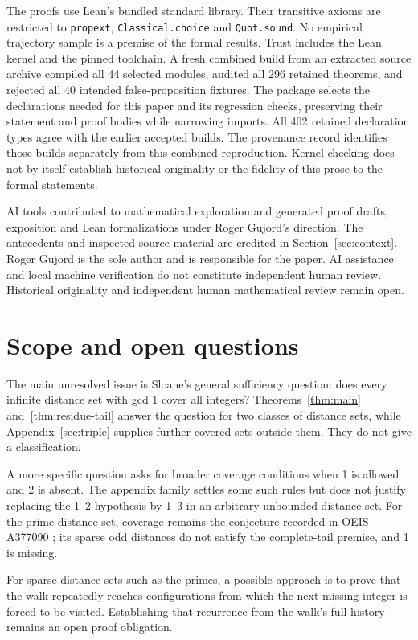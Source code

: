 \documentclass[11pt,a4paper]{article}
\newcommand{\code}[1]{\texttt{#1}}
\begin{document}
The proofs use Lean's bundled standard library. Their transitive axioms are
restricted to \code{propext}, \code{Classical.choice} and \code{Quot.sound}.
No empirical trajectory sample is a premise of the formal results.
Trust includes the Lean kernel and the pinned toolchain. A fresh combined
build from an extracted source archive compiled all 44 selected modules,
audited all 296 retained theorems, and rejected all 40 intended false-proposition
fixtures. The package selects the declarations needed for this paper and its
regression checks, preserving their statement and proof bodies while narrowing
imports. All 402 retained declaration types agree with the earlier accepted
builds. The provenance record identifies those builds separately from this
combined reproduction. Kernel checking does not by itself establish
historical originality or the fidelity of this prose to the formal statements.

AI tools contributed to mathematical exploration and generated proof drafts,
exposition and Lean formalizations under Roger Gujord's direction. The
antecedents and inspected source material are credited in
Section~\ref{sec:context}. Roger Gujord is the sole author and is responsible
for the paper. AI assistance and local machine verification do not
constitute independent human review.
Historical originality and independent human mathematical review remain open.

\section{Scope and open questions}\label{sec:questions}
The main unresolved issue is Sloane's general sufficiency question: does
every infinite distance set with gcd 1 cover all integers?
Theorems~\ref{thm:main} and~\ref{thm:residue-tail} answer the question for two classes of distance sets, while Appendix~\ref{sec:triple}
supplies further covered sets outside them. They do not give a classification.

A more specific question asks for broader coverage conditions when 1 is
allowed and 2 is absent. The appendix family settles some such rules but
does not justify replacing the 1--2 hypothesis by 1--3 in an arbitrary
unbounded distance set. For the prime distance set, coverage remains the
conjecture recorded in OEIS A377090 \cite{primes}; its sparse odd distances
do not satisfy the complete-tail premise, and 1 is missing.

For sparse distance sets such as the primes, a possible approach is to
prove that the walk repeatedly reaches configurations from which the next
missing integer is forced to be visited. Establishing that recurrence from
the walk's full history remains an open proof obligation.
\end{document}
